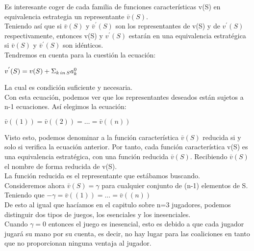 \documentclass[10pt,a4paper]{book}
\begin{document}
Es interesante coger de cada familia de funciones características v(S) en equivalencia estrategia un representante $\bar{v}(S)$. \\
Teniendo así que si $\bar{v}(S)$ y $\bar{v}^{'}(S)$ son los representantes de v(S) y de $v^{'}(S)$ respectivamente, entonces v(S) y $v^{'}(S)$ estarán en una equivalencia estratégica si $\bar{v}(S)$ y $\bar{v}^{'}(S)$ son idénticos.\\

Tendremos en cuenta para la cuestión la ecuación:\\


\begin{center}

$v^{'}(S)=v(S)+ \Sigma_{k \thinspace  in \thinspace S}a^0_k$

\end{center}

La cual es condición suficiente y necesaria.\\
Con esta ecuación, podemos ver que los representantes deseados están sujetos a n-1 ecuaciones.  Así elegimos la ecuación:\\

\begin{center}

$\bar{v}((1))=\bar{v}((2))= \ldots = \bar{v}((n))$

\end{center}

Visto esto, podemos denominar a la función característica $\bar{v}(S)$ reducida si y solo si verifica la ecuación anterior. Por tanto, cada función característica v(S) es una equivalencia estratégica, con una función reducida $\bar{v}(S)$. Recibiendo $\bar{v}(S)$ el nombre de forma reducida de v(S).\\

La función reducida es el representante que estábamos buscando.\\

Consideremos ahora $\bar{v}(S)=\gamma$ para cualquier conjunto de (n-1) elementos de S. Teniendo que $-\gamma = \bar{v}((1))= \ldots = \bar{v}((n))$\\

De esto al igual que hacíamos en el capitulo sobre n=3 jugadores, podemos distinguir dos tipos de juegos, los esenciales y los inesenciales.\\

Cuando $\gamma=0$ entonces el juego es inesencial, esto es debido a que cada jugador jugará su mano por su cuenta, es decir, no hay lugar para las coaliciones en tanto que no proporcionan ninguna ventaja al jugador.\\
\end{document}
